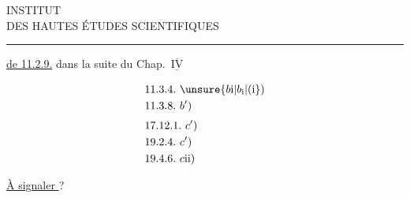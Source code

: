 
\begin{center}
INSTITUT\\
DES HAUTES ÉTUDES SCIENTIFIQUES\\
\rule{1.4cm}{0.4pt}
\end{center}

\uline{ de 11.2.9.} dans la suite du Chap.~$\overline{\underline{\mathrm{IV}}}$

\[
\begin{aligned}
&11.3.4.\ \unsure{b\mathrm{i}|b_{\mathrm{i}}|(\mathrm{i}})\\
&11.3.8.\ b')\\[3pt]
&17.12.1.\ c')\\
&19.2.4.\ c')\\
&19.4.6.\ c\mathrm{ii})
\end{aligned}
\]

\uline{À signaler } \uline{} ?
